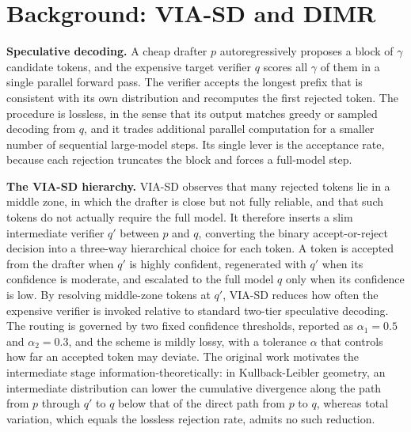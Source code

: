 \documentclass[11pt]{article}
\begin{document}
\section{Background: VIA-SD and DIMR}
\textbf{Speculative decoding.} A cheap drafter $p$ autoregressively proposes a block of $\gamma$
candidate tokens, and the expensive target verifier $q$ scores all $\gamma$ of them in a single
parallel forward pass. The verifier accepts the longest prefix that is consistent with its own
distribution and recomputes the first rejected token. The procedure is lossless, in the sense that its
output matches greedy or sampled decoding from $q$, and it trades additional parallel computation for a
smaller number of sequential large-model steps. Its single lever is the acceptance rate, because each
rejection truncates the block and forces a full-model step.

\textbf{The VIA-SD hierarchy.} VIA-SD observes that many rejected tokens lie in a middle zone, in which
the drafter is close but not fully reliable, and that such tokens do not actually require the full
model. It therefore inserts a slim intermediate verifier $q'$ between $p$ and $q$, converting the
binary accept-or-reject decision into a three-way hierarchical choice for each token. A token is
accepted from the drafter when $q'$ is highly confident, regenerated with $q'$ when its confidence is
moderate, and escalated to the full model $q$ only when its confidence is low. By resolving middle-zone
tokens at $q'$, VIA-SD reduces how often the expensive verifier is invoked relative to standard
two-tier speculative decoding. The routing is governed by two fixed confidence thresholds, reported as
$\alpha_1=0.5$ and $\alpha_2=0.3$, and the scheme is mildly lossy, with a tolerance $\alpha$ that
controls how far an accepted token may deviate. The original work motivates the intermediate stage
information-theoretically: in Kullback-Leibler geometry, an intermediate distribution can lower the
cumulative divergence along the path from $p$ through $q'$ to $q$ below that of the direct path from
$p$ to $q$, whereas total variation, which equals the lossless rejection rate, admits no such
reduction.
\end{document}
